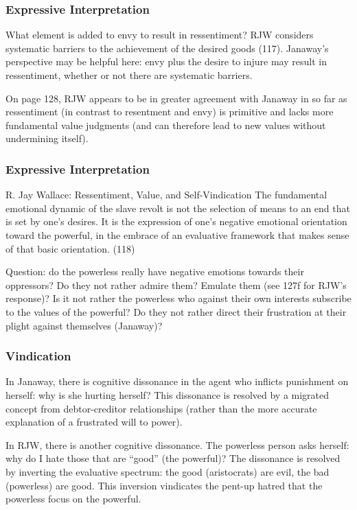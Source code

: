 \documentclass[xcolor=dvipsnames]{beamer}
\begin{document}
\begin{frame}
  \frametitle{Expressive Interpretation}
  What element is added to envy to result in ressentiment? RJW
  considers systematic barriers to the achievement of the desired
  goods (117). Janaway's perspective may be helpful here: envy plus
  the desire to injure may result in ressentiment, whether or not
  there are systematic barriers.

  \bigskip

  On page 128, RJW appears to be in greater agreement with Janaway in
  so far as ressentiment (in contrast to resentment and envy) is
  primitive and lacks more fundamental value judgments (and can
  therefore lead to new values without undermining itself).
\end{frame}

\begin{frame}
  \frametitle{Expressive Interpretation}
  \begin{block}{R. Jay Wallace: Ressentiment, Value, and
      Self-Vindication}
    The fundamental emotional dynamic of the slave revolt is not the
    selection of means to an end that is set by one's desires. It is
    the expression of one's negative emotional orientation toward the
    powerful, in the embrace of an evaluative framework that makes
    sense of that basic orientation. (118)
  \end{block}
  Question: do the powerless really have negative emotions towards
  their oppressors? Do they not rather admire them? Emulate them (see
  127f for RJW's response)? Is it not rather the powerless who against
  their own interests subscribe to the values of the powerful? Do they
  not rather direct their frustration at their plight against
  themselves (Janaway)?
\end{frame}

\begin{frame}
  \frametitle{Vindication}
  In Janaway, there is cognitive dissonance in the agent who inflicts
  punishment on herself: why is she hurting herself? This dissonance
  is resolved by a migrated concept from debtor-creditor
  relationships (rather than the more accurate explanation of a
  frustrated will to power).

  \bigskip

  In RJW, there is another cognitive dissonance. The powerless person
  asks herself: why do I hate those that are ``good'' (the powerful)?
  The dissonance is resolved by inverting the evaluative spectrum: the
  good (aristocrats) are evil, the bad (powerless) are good. This
  inversion vindicates the pent-up hatred that the powerless focus on
  the powerful.
\end{frame}
\end{document}
